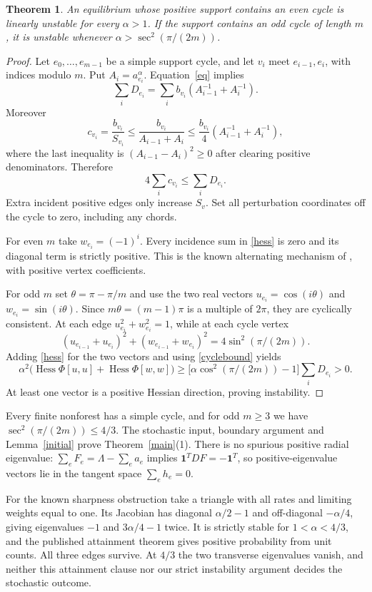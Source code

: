 \documentclass[11pt]{article}
\newtheorem{theorem}{Theorem}
\newcommand{\Hess}{\operatorname{Hess}}
\begin{document}
\begin{theorem}\label{cycle}
An equilibrium whose positive support contains an even cycle is
linearly unstable for every $\alpha>1$. If the support contains an odd
cycle of length $m$, it is unstable whenever
$\alpha>\sec^2(\pi/(2m))$.
\end{theorem}
\begin{proof}
Let $e_0,\ldots,e_{m-1}$ be a simple support cycle, and let $v_i$
meet $e_{i-1},e_i$, with indices modulo $m$. Put $A_i=a_{e_i}^\alpha$.
Equation~\eqref{eq} implies
\[
 \sum_iD_{e_i}
  =\sum_ib_{v_i}(A_{i-1}^{-1}+A_i^{-1}).
\]
Moreover
\[
 c_{v_i}=\frac{b_{v_i}}{S_{v_i}}
 \le\frac{b_{v_i}}{A_{i-1}+A_i}
 \le\frac{b_{v_i}}4(A_{i-1}^{-1}+A_i^{-1}),
\]
where the last inequality is $(A_{i-1}-A_i)^2\ge0$ after clearing
positive denominators. Therefore
\begin{equation}\label{cyclebound}
 4\sum_ic_{v_i}\le\sum_iD_{e_i}.
\end{equation}
Extra incident positive edges only increase $S_v$. Set all perturbation
coordinates off the cycle to zero, including any chords.

For even $m$ take $w_{e_i}=(-1)^i$. Every incidence sum in
\eqref{hess} is zero and its diagonal term is strictly positive.
This is the known alternating mechanism of \cite[Lemma~2]{HHK}, with
positive vertex coefficients.

For odd $m$ set $\theta=\pi-\pi/m$ and use the two real vectors
$u_{e_i}=\cos(i\theta)$ and $w_{e_i}=\sin(i\theta)$.
Since $m\theta=(m-1)\pi$ is a multiple of $2\pi$, they are cyclically
consistent. At each edge $u_{e_i}^2+w_{e_i}^2=1$, while at each cycle
vertex
\[
 (u_{e_{i-1}}+u_{e_i})^2+(w_{e_{i-1}}+w_{e_i})^2
 =4\sin^2(\pi/(2m)).
\]
Adding \eqref{hess} for the two vectors and using
\eqref{cyclebound} yields
\[
 \alpha^2\big(\Hess\Phi[u,u]+\Hess\Phi[w,w]\big)
 \ge\big[\alpha\cos^2(\pi/(2m))-1\big]\sum_iD_{e_i}>0.
\]
At least one vector is a positive Hessian direction, proving instability.
\end{proof}
Every finite nonforest has a simple cycle, and for odd $m\ge3$
we have $\sec^2(\pi/(2m))\le4/3$. The stochastic input, boundary
argument and Lemma~\ref{initial} prove Theorem~\ref{main}(1).
There is no spurious positive radial eigenvalue: $\sum_eF_e=\Lambda-\sum_ea_e$
implies $\mathbf1^TDF=-\mathbf1^T$, so positive-eigenvalue vectors lie
in the tangent space $\sum_eh_e=0$.

For the known sharpness obstruction take a triangle with all rates
and limiting weights equal to one. Its Jacobian has diagonal
$\alpha/2-1$ and off-diagonal $-\alpha/4$, giving eigenvalues
$-1$ and $3\alpha/4-1$ twice. It is strictly stable for
$1<\alpha<4/3$, and the published attainment theorem gives positive
probability from unit counts. All three edges survive. At $4/3$ the
two transverse eigenvalues vanish, and neither this attainment clause
nor our strict instability argument decides the stochastic outcome.
\end{document}
